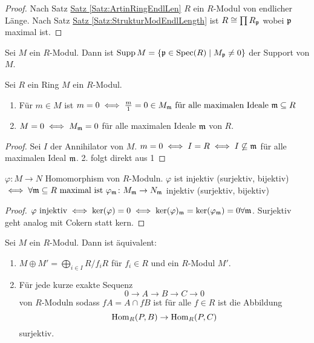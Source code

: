 \begin{proof}
    Nach Satz \hyperref[Satz:ArtinRingEndlLen]{Satz \ref{Satz:ArtinRingEndlLen}} $R$ ein $R$-Modul von endlicher Länge. Nach Satz \hyperref[Satz:StrukturModEndlLength]{Satz \ref{Satz:StrukturModEndlLength}} ist $R\cong \prod R_{\mathfrak{p}}$ wobei $\mathfrak{p}$ maximal ist.
\end{proof}


\begin{Def}
    Sei $M$ ein $R$-Modul. Dann ist $\operatorname{Supp} M=\{\mathfrak{p}\in\operatorname{Spec}(R)\mid M_{\mathfrak{p}}\neq 0\}$ der Support von $M$.
\end{Def}
\begin{Lemma}
    Sei $R$ ein Ring $M$ ein $R$-Modul.
    \begin{enumerate}
        \item Für $m\in M$ ist $m=0\iff \frac m 1=0\in M_{\mathfrak{m}} \text{ für alle maximalen Ideale $\mathfrak{m}\subseteq R$}$
        \item $M=0\iff M_{\mathfrak{m}}=0$ für alle maximalen Ideale $\mathfrak{m}$ von $R$.
    \end{enumerate}
\end{Lemma}
\begin{proof}
    Sei $I$ der Annihilator von $M$.
    $m=0\iff I=R\iff I\not\subseteq \mathfrak{m}$ für alle maximalen Ideal $\mathfrak{m}$.
    2. folgt direkt aus 1
\end{proof}
\begin{Kor}\label{Kor:LokSurjInjBij}
    $\varphi\colon M\to N$ Homomorphism von $R$-Moduln.
    $\varphi$ ist injektiv (surjektiv, bijektiv) $\iff \forall \mathfrak{m}\subseteq R \text{ maximal ist } \varphi_{\mathfrak{m}}\colon M_{\mathfrak{m}}\to N_{\mathfrak{m}}$ injektiv (surjektiv, bijektiv) 
\end{Kor}
\begin{proof}
    $\varphi \text{ injektiv} \iff \ker(\varphi)=0\iff \ker(\varphi)_{\mathfrak{m}}=\ker(\varphi_{\mathfrak{m}})=0 \forall \mathfrak{m}$. Surjektiv geht analog mit Cokern statt kern.
\end{proof}
\begin{Lemma}\label{Lem:SpaltenModDirSum}
    Sei $M$ ein $R$-Modul. Dann ist äquivalent:
    \begin{enumerate}
        \item $M\oplus M'=\bigoplus_{i\in I}R/f_iR$ für $f_i\in R$ und ein $R$-Modul $M'$.
        \item Für jede kurze exakte Sequenz $$0\to A\to B\to C\to 0$$ von $R$-Moduln sodass $fA=A\cap fB$ ist für alle $f\in R$ ist die Abbildung $$\operatorname{Hom}_R(P,B)\to\operatorname{Hom}_R(P,C)$$ surjektiv.
    \end{enumerate}
\end{Lemma}
